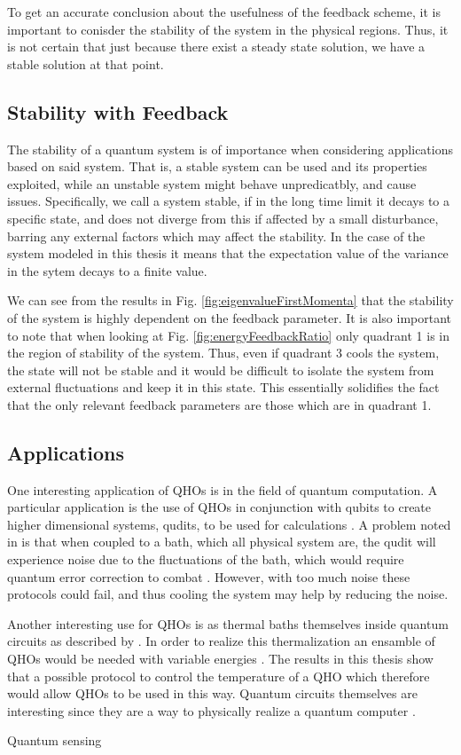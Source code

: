 To get an accurate conclusion about the usefulness of the feedback scheme, it is important to conisder the stability of the system in the physical regions. Thus, it is not certain that just because there exist a steady state solution, we have a stable solution at that point.



\subsection{Stability with Feedback}
The stability of a quantum system is of importance when considering applications based on said system. That is, a stable system can be used and its properties exploited, while an unstable system might behave unpredicatbly, and cause issues. Specifically, we call a system stable, if in the long time limit it decays to a specific state, and does not diverge from this if affected by a small disturbance, barring any external factors which may affect the stability. In the case of the system modeled in this thesis it means that the expectation value of the variance in the sytem decays to a finite value.

We can see from the results in Fig. \ref{fig:eigenvalueFirstMomenta} that the stability of the system is highly dependent on the feedback parameter. It is also important to note that when looking at Fig. \ref{fig:energyFeedbackRatio} only quadrant 1 is in the region of stability of the system. Thus, even if quadrant 3 cools the system, the state will not be stable and it would be difficult to isolate the system from external fluctuations and keep it in this state. This essentially solidifies the fact that the only relevant feedback parameters are those which are in quadrant 1. 


\subsection{Applications}
One interesting application of QHOs is in the field of quantum computation. A particular application is the use of QHOs in conjunction with qubits to create higher dimensional systems, qudits, to be used for calculations \cite{Liu:2021}. A problem noted in \cite{Liu:2021} is that when coupled to a bath, which all physical system are, the qudit will experience noise due to the fluctuations of the bath, which would require quantum error correction to combat \cite{Liu:2021}. However, with too much noise these protocols could fail, and thus cooling the system may help by reducing the noise.

Another interesting use for QHOs is as thermal baths themselves inside quantum circuits as described by \cite{Pekola:2024}. In order to realize this thermalization an ensamble of QHOs would be needed with variable energies \cite{Pekola:2024}. The results in this thesis show that a possible protocol to control the temperature of a QHO which therefore would allow QHOs to be used in this way. Quantum circuits themselves are interesting since they are a way to physically realize a quantum computer \cite{Nielsen:2010}. 



Quantum sensing\\
